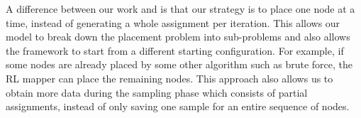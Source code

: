 
A difference between our work and \cite{zhou2019gdp} is that our strategy is to place one node at a time, instead of generating a whole assignment per iteration. 
This allows our model to break down the placement problem into sub-problems and also allows the framework to start from a different starting configuration. 
For example, if some nodes are already placed by some other algorithm such as brute force, the RL mapper can place the remaining nodes. 
This approach also allows us to obtain more data during the sampling phase which consists of partial assignments, instead of only saving one sample for an entire sequence of nodes.